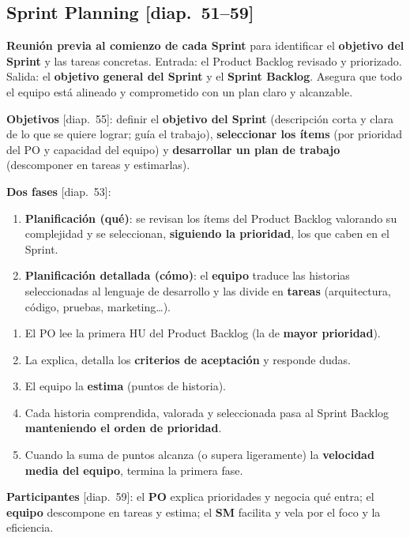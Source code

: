 \documentclass[11pt,a4paper,oneside,openany]{report}
\newcommand{\diap}[1]{\textcolor{mdaPrimary}{\small[diap.~#1]}}
\begin{document}
\subsection{Sprint Planning \diap{51--59}}
\textbf{Reunión previa al comienzo de cada Sprint} para identificar el \textbf{objetivo del Sprint} y las tareas
concretas. Entrada: el Product Backlog revisado y priorizado. Salida: el \textbf{objetivo general del Sprint} y el
\textbf{Sprint Backlog}. Asegura que todo el equipo está alineado y comprometido con un plan claro y alcanzable.

\textbf{Objetivos} \diap{55}: definir el \textbf{objetivo del Sprint} (descripción corta y clara de lo que se quiere
lograr; guía el trabajo), \textbf{seleccionar los ítems} (por prioridad del PO y capacidad del equipo) y
\textbf{desarrollar un plan de trabajo} (descomponer en tareas y estimarlas).

\textbf{Dos fases} \diap{53}:
\begin{enumerate}[leftmargin=*]
  \item \textbf{Planificación (qué)}: se revisan los ítems del Product Backlog valorando su complejidad y se
        seleccionan, \textbf{siguiendo la prioridad}, los que caben en el Sprint.
  \item \textbf{Planificación detallada (cómo)}: el \textbf{equipo} traduce las historias seleccionadas al lenguaje de
        desarrollo y las divide en \textbf{tareas} (arquitectura, código, pruebas, marketing…).
\end{enumerate}
\begin{teorema}[selección de historias, paso a paso \diap{56}]
\begin{enumerate}[leftmargin=*,itemsep=1pt]
  \item El PO lee la primera HU del Product Backlog (la de \textbf{mayor prioridad}).
  \item La explica, detalla los \textbf{criterios de aceptación} y responde dudas.
  \item El equipo la \textbf{estima} (puntos de historia).
  \item Cada historia comprendida, valorada y seleccionada pasa al Sprint Backlog \textbf{manteniendo el orden de
        prioridad}.
  \item Cuando la suma de puntos alcanza (o supera ligeramente) la \textbf{velocidad media del equipo}, termina la
        primera fase.
\end{enumerate}
\end{teorema}
\textbf{Participantes} \diap{59}: el \textbf{PO} explica prioridades y negocia qué entra; el \textbf{equipo}
descompone en tareas y estima; el \textbf{SM} facilita y vela por el foco y la eficiencia.
\end{document}
